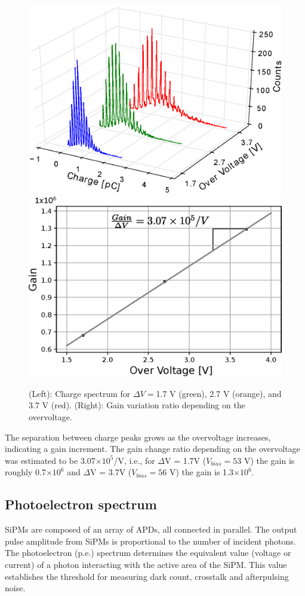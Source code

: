 \documentclass[a4paper,11pt]{article}
\begin{document}
\begin{figure}[htbp]
\centering %
\includegraphics[width=.49\textwidth]{Figures/GainCharge_enhanced.eps}
\quad
\includegraphics[width=.47\textwidth]{Figures/G_OV_1350CS.eps}
\caption{\label{fig:gain} (Left): Charge spectrum for $\Delta V=$1.7 V (green), 2.7 V (orange), and 3.7 V (red). (Right): Gain variation ratio depending on the overvoltage.}
\end{figure}

The separation between charge peaks grows as the overvoltage increases, indicating a gain increment. The gain change ratio depending on the overvoltage was estimated to be 3.07$\times10^5$/V, i.e., for $\Delta$V = 1.7V ($V_{bias} = 53$ V) the gain is roughly 0.7$\times10^6$ and $\Delta$V = 3.7V ($V_{bias} = 56$ V) the gain is 1.3$\times10^6$.

\subsection{Photoelectron spectrum}

SiPMs are composed of an array of APDs, all connected in parallel. The output pulse amplitude from SiPMs is proportional to the number of incident photons. The photoelectron (p.e.) spectrum determines the equivalent value (voltage or current) of a photon interacting with the active area of the SiPM. This value establishes the threshold for measuring dark count, crosstalk and afterpulsing noise.
\end{document}

